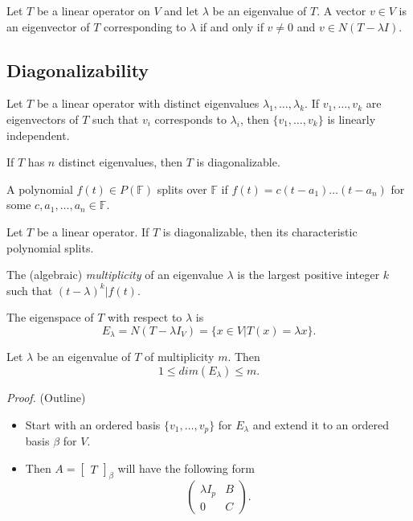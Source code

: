 \documentclass[12pt]{article}
\newenvironment{theorem}[2][Theorem]{\begin{trivlist}
\item[\hskip \labelsep {\bfseries #1}\hskip \labelsep {\bfseries #2.}]}{\end{trivlist}}
\newenvironment{corollary}[2][Corollary]{\begin{trivlist}
\item[\hskip \labelsep {\bfseries #1}\hskip \labelsep {\bfseries #2}]}{\end{trivlist}}
\newenvironment{definition}[2][Definition]{\begin{trivlist}
\item[\hskip \labelsep {\bfseries #1}\hskip \labelsep {\bfseries #2}]}{\end{trivlist}}
\begin{document}
\begin{theorem}{5.4}
Let $T$ be a linear operator on $V$ and let $\lambda$ be an eigenvalue of $T$. A vector $v \in V$ is an eigenvector of $T$ corresponding to $\lambda$ if and only if $v \neq 0$ and $v \in N(T - \lambda I)$.
\end{theorem}

\subsection{Diagonalizability}

\begin{theorem}{5.5}
Let $T$ be a linear operator with distinct eigenvalues $\lambda_1, \dots, \lambda_k$. If $v_1, \dots, v_k$ are eigenvectors of $T$ such that $v_i$ corresponds to $\lambda_i$, then $\{v_1, \dots, v_k\}$ is linearly independent. 
\end{theorem}

\begin{corollary}{6}
If $T$ has $n$ distinct eigenvalues, then $T$ is diagonalizable.
\end{corollary}

\begin{definition}{4}
A polynomial $f(t) \in P(\mathbb{F})$ splits over $\mathbb{F}$ if $f(t) = c(t - a_1) \dots (t - a_n)$ for some $c, a_1, \dots, a_n \in \mathbb{F}$.
\end{definition}

\begin{theorem}{5.6}
Let $T$ be a linear operator. If $T$ is diagonalizable, then its characteristic polynomial splits.
\end{theorem}

\begin{definition}{5}
The (algebraic) \textit{multiplicity} of an eigenvalue $\lambda$ is the largest positive integer $k$ such that $(t - \lambda)^k | f(t)$.
\end{definition}

\noindent The eigenspace of $T$ with respect to $\lambda$ is $$E_\lambda = N(T - \lambda I_V) = \{x \in V | T(x) = \lambda x\}.$$

\begin{theorem}{5.7}
Let $\lambda$ be an eigenvalue of $T$ of multiplicity $m$. Then $$1 \leq dim(E_\lambda) \leq m.$$
\end{theorem}

\textit{Proof.} (Outline)
\begin{itemize}
    \item Start with an ordered basis $\{v_1, \dots, v_p\}$ for $E_\lambda$ and extend it to an ordered basis $\beta$ for $V$.
    
    \item Then $A = \begin{bmatrix} T \end{bmatrix}_\beta$ will have the following form $$\begin{pmatrix}
    \lambda I_p & B \\ 0 & C
    \end{pmatrix}.$$
\end{itemize}
\end{document}
